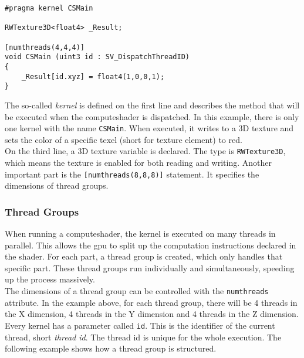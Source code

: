 \begin{lstlisting}[language=HLSL, caption=A standard \gls{computeshader} template., label=lst:shader:compute:standard]
#pragma kernel CSMain

RWTexture3D<float4> _Result;

[numthreads(4,4,4)]
void CSMain (uint3 id : SV_DispatchThreadID)
{
    _Result[id.xyz] = float4(1,0,0,1);
}
\end{lstlisting}

\noindent
The so-called \emph{\gls{kernel}} is defined on the first line and describes the method that will be executed when the \gls{computeshader} is dispatched.
In this example, there is only one \gls{kernel} with the name \lstinline[language=HLSL]{CSMain}.
When executed, it writes to a 3D texture and sets the color of a specific \gls{texel} (short for texture element) to red.
\\
On the third line, a 3D texture variable is declared.
The type is \lstinline[language=HLSL]{RWTexture3D}, which means the texture is enabled for both reading and writing.
Another important part is the \lstinline[language=HLSL]{[numthreads(8,8,8)]} statement. It specifies the dimensions of thread groups.

\subsubsection{Thread Groups}
When running a \gls{computeshader}, the kernel is executed on many threads in parallel.
This allows the \gls{gpu} to split up the computation instructions declared in the \gls{shader}.
For each part, a thread group is created, which only handles that specific part.
These thread groups run individually and simultaneously, speeding up the process massively.
\\
The dimensions of a thread group can be controlled with the \lstinline[language=HLSL]{numthreads} attribute.
In the example above, for each thread group, there will be 4 threads in the X dimension, 4 threads in the Y dimension and 4 threads in the Z dimension.
\emptyline
Every \gls{kernel} has a parameter called \lstinline[language=HLSL]{id}. This is the identifier of the current thread, short \emph{thread id}.
The thread id is unique for the whole execution. The following example shows how a thread group is structured.

